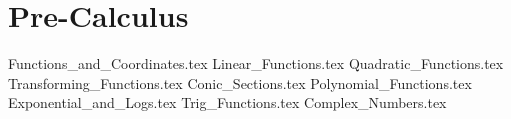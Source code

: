 \section{Pre-Calculus}

{Functions_and_Coordinates.tex}
{Linear_Functions.tex}
{Quadratic_Functions.tex}
{Transforming_Functions.tex}
{Conic_Sections.tex}
{Polynomial_Functions.tex}
{Exponential_and_Logs.tex}
{Trig_Functions.tex}
{Complex_Numbers.tex}